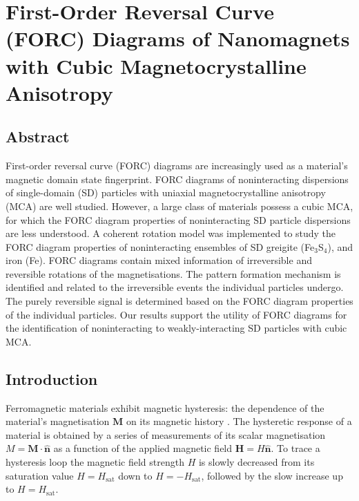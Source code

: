\chapter{First-Order Reversal Curve (FORC) Diagrams of Nanomagnets with Cubic Magnetocrystalline Anisotropy}
\label{ch:res-2}
\fancyhead[C]{}
\fancyhead[R]{}
\fancyfoot[C]{\thepage}

\section*{Abstract}
First-order reversal curve (FORC) diagrams are increasingly used as a material's magnetic domain state fingerprint. FORC diagrams of noninteracting dispersions of single-domain (SD) particles with uniaxial magnetocrystalline anisotropy (MCA) are well studied. However, a large class of materials possess a cubic MCA, for which the FORC diagram properties of noninteracting SD particle dispersions are less understood. A coherent rotation model was implemented to study the FORC diagram properties of noninteracting ensembles of SD greigite (Fe$_3$S$_4$), and iron (Fe). FORC diagrams contain mixed information of irreversible and reversible rotations of the magnetisations. The pattern formation mechanism is identified and related to the irreversible events the individual particles undergo. The purely reversible signal is determined based on the FORC diagram properties of the individual particles. Our results support the utility of FORC diagrams for the identification of noninteracting to weakly-interacting SD particles with cubic MCA.\par


\section{Introduction}
Ferromagnetic materials exhibit magnetic hysteresis: the dependence of the material's magnetisation $\boldsymbol{M}$ on its magnetic history \citep{Mayergoyz1986}. The hysteretic response of a material is obtained by a series of measurements of its scalar magnetisation $M=\boldsymbol{M} \cdot \boldsymbol{\hat{n}}$ as a function of the applied magnetic field $\boldsymbol{H}=H\boldsymbol{\hat{n}}$. To trace a hysteresis loop the magnetic field strength $H$ is slowly decreased from its saturation value $H=H_{\text{sat}}$ down to $H=-H_{\text{sat}}$, followed by the slow increase up to $H=H_{\text{sat}}$.\par

